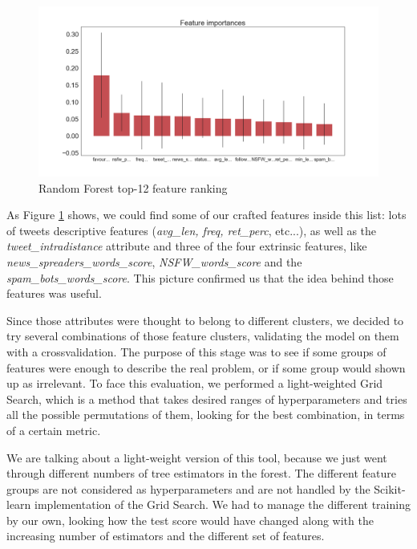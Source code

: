 \begin{figure}[htp!]
	\centering
	\includegraphics[width=\columnwidth]{chapter5/figure/top_12_features_importances.png}
	\caption{Random Forest top-12 feature ranking}
	\label{fig:feature_rank}
\end{figure}

As Figure \ref{fig:feature_rank} shows, we could find some of our crafted features inside this list: lots of tweets descriptive features (\textit{avg\_len, freq, ret\_perc}, etc...), as well as the \textit{tweet\_intradistance} attribute and three of the four extrinsic features, like \textit{news\_spreaders\_words\_score}, \textit{NSFW\_words\_score} and the \textit{spam\_bots\_words\_score}.
This picture confirmed us that the idea behind those features was useful.

Since those attributes were thought to belong to different clusters, we decided to try several combinations of those feature clusters, validating the model on them with a crossvalidation. The purpose of this stage was to see if some groups of features were enough to describe the real problem, or if some group would shown up as irrelevant.
To face this evaluation, we performed a light-weighted Grid Search, which is a method that takes desired ranges of hyperparameters and tries all the possible permutations of them, looking for the best combination, in terms of a certain metric.

We are talking about a light-weight version of this tool, because we just went through different numbers of tree estimators in the forest. The different feature groups are not considered as hyperparameters and are not handled by the Scikit-learn implementation of the Grid Search.
We had to manage the different training by our own, looking how the test score would have changed along with the increasing number of estimators and the different set of features.

